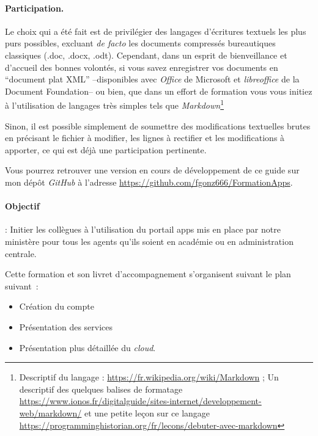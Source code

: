 \paragraph*{Participation.}
Le choix qui a été fait est de privilégier des langages d'écritures textuels les plus purs possibles, excluant \emph{de facto\/} les documents compressés bureautiques classiques (.doc, .docx, .odt). 
Cependant, dans un esprit de bienveillance et d'accueil des bonnes volontés, si vous savez enregistrer vos documents en ``document plat XML'' --disponibles avec \emph{Office} de Microsoft et \emph{libreoffice} de la Document Foundation-- ou bien, que dans un effort de formation vous vous initiez à l'utilisation de langages très simples tels que \emph{Markdown}\footnote{%
Descriptif du langage : \url{https://fr.wikipedia.org/wiki/Markdown} ; Un descriptif des quelques balises de formatage \url{https://www.ionos.fr/digitalguide/sites-internet/developpement-web/markdown/} et une petite leçon sur ce langage \url{https://programminghistorian.org/fr/lecons/debuter-avec-markdown}
}

Sinon, il est possible simplement de soumettre des modifications textuelles brutes en précisant le fichier à modifier, les lignes à rectifier et les modifications à apporter, ce qui est déjà une participation pertinente.

Vous pourrez retrouver une version en cours de développement de ce guide sur mon dépôt \emph{GitHub} à l'adresse \url{https://github.com/fgonz666/FormationApps}.




\paragraph{Objectif} : Initier les collègues à l'utilisation du portail apps mis en place par notre ministère pour tous les agents qu'ils soient en académie ou en administration centrale. 

\vspace{2cm}

Cette formation et son livret d'accompagnement s'organisent suivant le plan suivant~:
\begin{itemize}
    \item Création du compte
    \item Présentation des services
    \item Présentation plus détaillée du \emph{cloud\/}.
\end{itemize}

